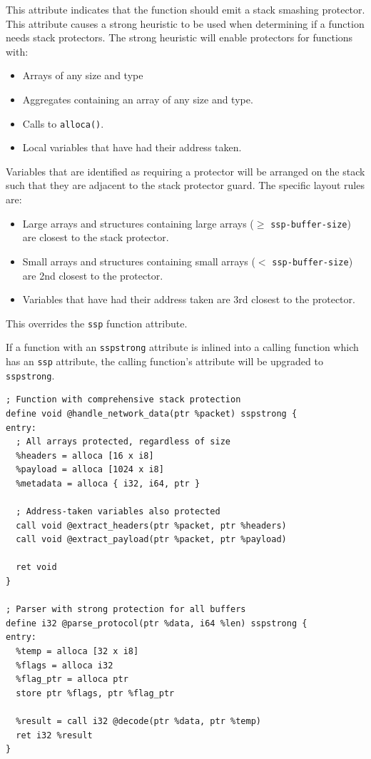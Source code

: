 This attribute indicates that the function should emit a stack smashing protector.
This attribute causes a strong heuristic to be used when determining if a function needs stack protectors.
The strong heuristic will enable protectors for functions with:

\begin{itemize}
\item Arrays of any size and type
\item Aggregates containing an array of any size and type.
\item Calls to \texttt{alloca()}.
\item Local variables that have had their address taken.
\end{itemize}

Variables that are identified as requiring a protector will be arranged on the stack such that they are adjacent to the stack protector guard.
The specific layout rules are:

\begin{itemize}
\item Large arrays and structures containing large arrays ($\geq$ \texttt{ssp-buffer-size}) are closest to the stack protector.
\item Small arrays and structures containing small arrays ($<$ \texttt{ssp-buffer-size}) are 2nd closest to the protector.
\item Variables that have had their address taken are 3rd closest to the protector.
\end{itemize}

This overrides the \texttt{ssp} function attribute.

If a function with an \texttt{sspstrong} attribute is inlined into a calling function which has an \texttt{ssp} attribute, the calling function's attribute will be upgraded to \texttt{sspstrong}.

\begin{lstlisting}[style=ir]
; Function with comprehensive stack protection
define void @handle_network_data(ptr %packet) sspstrong {
entry:
  ; All arrays protected, regardless of size
  %headers = alloca [16 x i8]
  %payload = alloca [1024 x i8]
  %metadata = alloca { i32, i64, ptr }

  ; Address-taken variables also protected
  call void @extract_headers(ptr %packet, ptr %headers)
  call void @extract_payload(ptr %packet, ptr %payload)

  ret void
}

; Parser with strong protection for all buffers
define i32 @parse_protocol(ptr %data, i64 %len) sspstrong {
entry:
  %temp = alloca [32 x i8]
  %flags = alloca i32
  %flag_ptr = alloca ptr
  store ptr %flags, ptr %flag_ptr

  %result = call i32 @decode(ptr %data, ptr %temp)
  ret i32 %result
}
\end{lstlisting}

